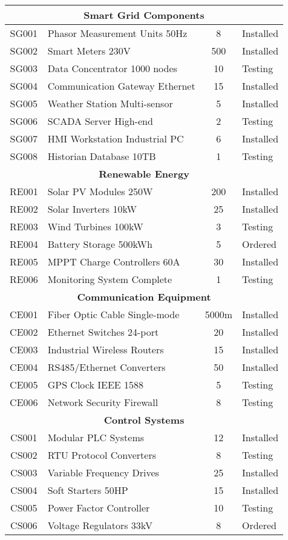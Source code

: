 \begin{longtable}{|c|l|c|l|}
	\multicolumn{4}{|c|}{\textbf{Smart Grid Components}} \\
	\hline
	SG001 & Phasor Measurement Units 50Hz & 8 & Installed \\
	SG002 & Smart Meters 230V & 500 & Installed \\
	SG003 & Data Concentrator 1000 nodes & 10 & Testing \\
	SG004 & Communication Gateway Ethernet & 15 & Installed \\
	SG005 & Weather Station Multi-sensor & 5 & Installed \\
	SG006 & SCADA Server High-end & 2 & Testing \\
	SG007 & HMI Workstation Industrial PC & 6 & Installed \\
	SG008 & Historian Database 10TB & 1 & Testing \\
	\hline
	
	\multicolumn{4}{|c|}{\textbf{Renewable Energy}} \\
	\hline
	RE001 & Solar PV Modules 250W & 200 & Installed \\
	RE002 & Solar Inverters 10kW & 25 & Installed \\
	RE003 & Wind Turbines 100kW & 3 & Testing \\
	RE004 & Battery Storage 500kWh & 5 & Ordered \\
	RE005 & MPPT Charge Controllers 60A & 30 & Installed \\
	RE006 & Monitoring System Complete & 1 & Testing \\
	\hline
	
	\multicolumn{4}{|c|}{\textbf{Communication Equipment}} \\
	\hline
	CE001 & Fiber Optic Cable Single-mode & 5000m & Installed \\
	CE002 & Ethernet Switches 24-port & 20 & Installed \\
	CE003 & Industrial Wireless Routers & 15 & Installed \\
	CE004 & RS485/Ethernet Converters & 50 & Installed \\
	CE005 & GPS Clock IEEE 1588 & 5 & Testing \\
	CE006 & Network Security Firewall & 8 & Testing \\
	\hline
	
	\multicolumn{4}{|c|}{\textbf{Control Systems}} \\
	\hline
	CS001 & Modular PLC Systems & 12 & Installed \\
	CS002 & RTU Protocol Converters & 8 & Testing \\
	CS003 & Variable Frequency Drives & 25 & Installed \\
	CS004 & Soft Starters 50HP & 15 & Installed \\
	CS005 & Power Factor Controller & 10 & Testing \\
	CS006 & Voltage Regulators 33kV & 8 & Ordered \\
	\hline
	

\end{longtable}
